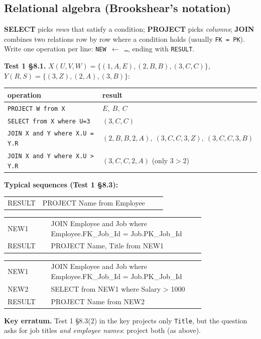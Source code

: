 \documentclass{fkt-notes}
\makeatletter
\newcommand{\erratum}[1]{\par\noindent\textbf{Key erratum.} #1\par}
\newenvironment{relalg}
  {\par\noindent\ttfamily\small
   \begin{tabular}{@{}l@{\ $\leftarrow$\ }p{0.78\linewidth}@{}}}
  {\end{tabular}\par}
\makeatother
\begin{document}
\subsection{Relational algebra (Brookshear's notation)}
\begin{rulepar}
  \textbf{SELECT} picks \emph{rows} that satisfy a condition; \textbf{PROJECT} picks \emph{columns};
  \textbf{JOIN} combines two relations row by row where a condition holds (usually \texttt{FK = PK}). Write one
  operation per line: \texttt{NEW $\leftarrow$ \dots}, ending with \texttt{RESULT}.
\end{rulepar}
\textbf{Test 1 \S8.1.} $X(U,V,W)=\{(1,A,E),(2,B,B),(3,C,C)\}$, $Y(R,S)=\{(3,Z),(2,A),(3,B)\}$:
\begin{center}
  \small
  \begin{tabular}{@{}ll@{}}
    \toprule
    operation                             & result                                    \\
    \midrule
    \texttt{PROJECT W from X}             & $E,\ B,\ C$                               \\
    \texttt{SELECT from X where U=3}      & $(3,C,C)$                                 \\
    \texttt{JOIN X and Y where X.U = Y.R} & $(2,B,B,2,A),\ (3,C,C,3,Z),\ (3,C,C,3,B)$ \\
    \texttt{JOIN X and Y where X.U > Y.R} & $(3,C,C,2,A)$ \quad (only $3>2$)          \\
    \bottomrule
  \end{tabular}
\end{center}
\textbf{Typical sequences (Test 1 \S8.3):}
\begin{relalg}
  RESULT & PROJECT Name from Employee \\
\end{relalg}
\begin{relalg}
  NEW1   & JOIN Employee and Job where Employee.FK\_Job\_Id = Job.PK\_Job\_Id \\
  RESULT & PROJECT Name, Title from NEW1 \\
\end{relalg}
\begin{relalg}
  NEW1   & JOIN Employee and Job where Employee.FK\_Job\_Id = Job.PK\_Job\_Id \\
  NEW2   & SELECT from NEW1 where Salary > 1000 \\
  RESULT & PROJECT Name from NEW2 \\
\end{relalg}
\erratum{Test 1 \S8.3(2) in the key projects only \texttt{Title}, but the question asks for job titles \emph{and
    employee names}: project both (as above).}
\end{document}
